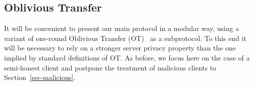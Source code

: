 \documentclass[11pt]{article}
\newcommand{\full}[1]{}
\newtheorem{Remark}[theorem]{Remark}
\newenvironment{remark}{\begin{Remark}\begin{rm}}{\end{rm}\end{Remark}}
\newcommand\ot{\mbox{OT}\xspace}
\begin{document}
\full{
\begin{remark}
A protocol $\Pi$ as above can be trivially turned into a one-round
secure two-party protocol for the function $U(\cdot,\cdot)$. In
this protocol the client (on input $x$) sends $pk,c$ to the server,
the server (on input $P$) responds with $c'$, and the client
recovers the output $U(P,x)$. The protocol satisfies a strong
simulation-based security definition which strengthens standard
definitions of secure computation from the literature
(e.g.,~\cite{Can00,Gol04}) in that it does not impose an a-priori
polynomial relation between the lengths of the two inputs and the
security parameter.
See Appendix~\ref{app-mpc} for a formalization of this notion.
\end{remark}
}


\subsection{Oblivious Transfer} \label{sec-ot} It will be
convenient to present our main protocol in a modular way, using a
variant of one-round Oblivious Transfer (\ot)~\cite{Ra,EGL} as a
subprotocol. To this end it will be necessary to rely on a stronger
server privacy property than the one implied by standard definitions
of \ot. As before, we focus here on the case of a semi-honest client
and postpone the treatment of malicious clients to
Section~\ref{sec-malicious}.
\end{document}
